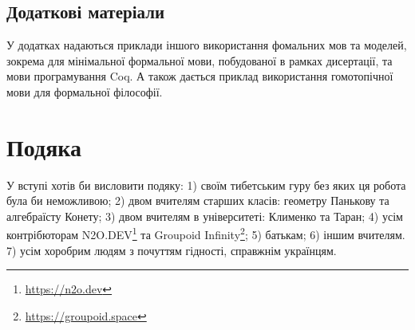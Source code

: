 \subsection*{Додаткові матеріали}
У додатках надаються приклади іншого використання фомальних мов та моделей,
зокрема для мінімальної формальної мови, побудованої в рамках дисертації,
та мови програмування Coq. А також дається приклад використання
гомотопічної мови для формальної філософії.

\section{Подяка}
У вступі хотів би висловити подяку:
1) своїм тибетським гуру без яких ця робота була би неможливою;
2) двом вчителям старших класів: геометру Панькову та алгебраїсту Конету;
3) двом вчителям в університеті: Клименко та Таран;
4) усім контрібюторам N2O.DEV\footnote{\url{https://n2o.dev}} та Groupoid Infinity\footnote{\url{https://groupoid.space}};
5) батькам;
6) іншим вчителям.
7) усім хоробрим людям з почуттям гідності, справжнім українцям.

